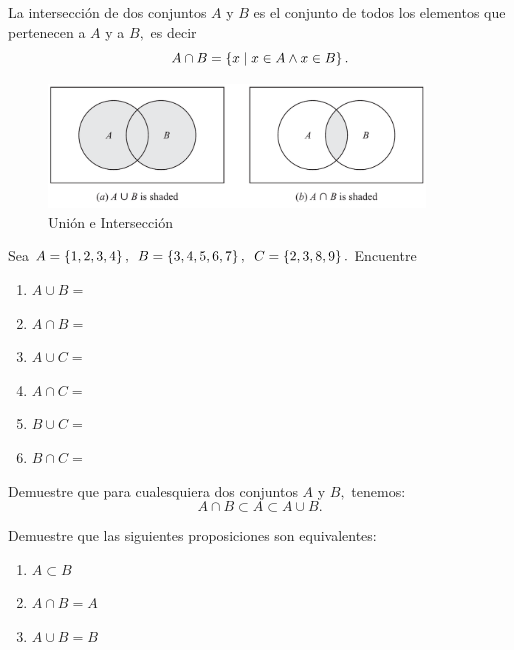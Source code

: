 \documentclass[xcolor={svgnames},
  hyperref={colorlinks}, 
  spanish, 12pt]{beamer}
\numberwithin{equation}{section} %
\numberwithin{figure}{section} %
\begin{document}
\begin{frame}
 La intersecci\'on de dos conjuntos $A$ y $B$ es el conjunto de todos los elementos que pertenecen a $A$ y a $B,$ \pause es decir
 $$
 A \cap B = \left\{ x \mid x\in A \wedge x\in B \right\}.
 $$
\end{frame}

\begin{frame}
 \begin{figure}
 \centering
 \includegraphics[width=10cm,keepaspectratio=true]{./venn_union_interseccion.png}
 \caption{Unión e Intersección}
 \label{fig:0103}
\end{figure}

\end{frame}


\begin{frame}
 \begin{exmp}
  \label{lip:exmp:1.4.a}
  Sea $A=\left\{ 1,2,3,4 \right\},$ $B=\left\{ 3,4,5,6,7 \right\},$ $C=\left\{ 2,3,8,9 \right\}.$ Encuentre 
  \begin{enumerate}
   \item $A \cup B=$ \pause
   \item $A \cap B=$ \pause
   \item $A \cup C=$ \pause
   \item $A \cap C=$ \pause
   \item $B \cup C=$ \pause
   \item $B \cap C=$
  \end{enumerate}

 \end{exmp}

\end{frame}

\begin{frame}
 \begin{exmp}
  \label{thm:1.3}
  Demuestre que para cualesquiera dos conjuntos $A$ y $B,$ tenemos:
  $$
  A \cap B \subset A \subset A \cup B.
  $$
 \end{exmp}

\end{frame}

\begin{frame}
 \begin{exmp}
  \label{thm:1.4}
  Demuestre que las siguientes proposiciones son equivalentes:
  \begin{enumerate}
   \item $\displaystyle A \subset B$
   \item $\displaystyle A \cap B = A$
   \item $\displaystyle A \cup B = B$
  \end{enumerate}

 \end{exmp}

\end{frame}
\end{document}
